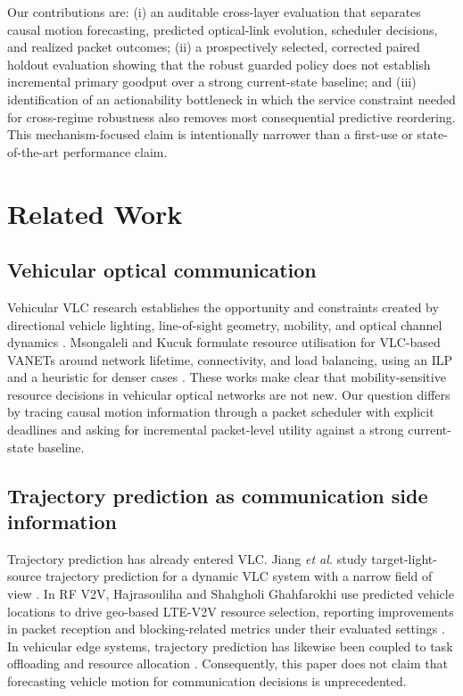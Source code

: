 \documentclass[conference]{IEEEtran}
\begin{document}
Our contributions are: (i) an auditable cross-layer evaluation that separates causal motion forecasting, predicted optical-link evolution, scheduler decisions, and realized packet outcomes; (ii) a prospectively selected, corrected paired holdout evaluation showing that the robust guarded policy does not establish incremental primary goodput over a strong current-state baseline; and (iii) identification of an actionability bottleneck in which the service constraint needed for cross-regime robustness also removes most consequential predictive reordering. This mechanism-focused claim is intentionally narrower than a first-use or state-of-the-art performance claim.

\section{Related Work}
\subsection{Vehicular optical communication}
Vehicular VLC research establishes the opportunity and constraints created by directional vehicle lighting, line-of-sight geometry, mobility, and optical channel dynamics \cite{memedi2021vehicular}. Msongaleli and Kucuk formulate resource utilisation for VLC-based VANETs around network lifetime, connectivity, and load balancing, using an ILP and a heuristic for denser cases \cite{msongaleli2020resource}. These works make clear that mobility-sensitive resource decisions in vehicular optical networks are not new. Our question differs by tracing causal motion information through a packet scheduler with explicit deadlines and asking for incremental packet-level utility against a strong current-state baseline.

\subsection{Trajectory prediction as communication side information}
Trajectory prediction has already entered VLC. Jiang \emph{et al.} study target-light-source trajectory prediction for a dynamic VLC system with a narrow field of view \cite{jiang2020trajectory}. In RF V2V, Hajrasouliha and Shahgholi Ghahfarokhi use predicted vehicle locations to drive geo-based LTE-V2V resource selection, reporting improvements in packet reception and blocking-related metrics under their evaluated settings \cite{hajrasouliha2021trajectory}. In vehicular edge systems, trajectory prediction has likewise been coupled to task offloading and resource allocation \cite{guo2022trajectoryoffload,lu2024predictive}. Consequently, this paper does not claim that forecasting vehicle motion for communication decisions is unprecedented.
\end{document}

